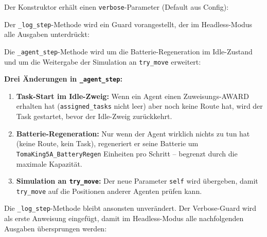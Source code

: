 Der Konstruktor erhält einen \texttt{verbose}-Parameter (Default aus Config):



Der \texttt{\_log\_step}-Methode wird ein Guard vorangestellt, der im Headless-Modus alle Ausgaben unterdrückt:



Die \texttt{\_agent\_step}-Methode wird um die Batterie-Regeneration im Idle-Zustand und um die Weitergabe der Simulation an \texttt{try\_move} erweitert:



\textbf{Drei Änderungen in \texttt{\_agent\_step}:}
\begin{enumerate}
    \item \textbf{Task-Start im Idle-Zweig:} Wenn ein Agent einen Zuweisungs-AWARD erhalten hat (\texttt{assigned\_tasks} nicht leer) aber noch keine Route hat, wird der Task gestartet, bevor der Idle-Zweig zurückkehrt.
    \item \textbf{Batterie-Regeneration:} Nur wenn der Agent wirklich nichts zu tun hat (keine Route, kein Task), regeneriert er seine Batterie um \texttt{TomaKing5A\_BatteryRegen} Einheiten pro Schritt -- begrenzt durch die maximale Kapazität.
    \item \textbf{Simulation an \texttt{try\_move}:} Der neue Parameter \texttt{self} wird übergeben, damit \texttt{try\_move} auf die Positionen anderer Agenten prüfen kann.
\end{enumerate}

Die \texttt{\_log\_step}-Methode bleibt ansonsten unverändert. Der Verbose-Guard wird als erste Anweisung eingefügt, damit im Headless-Modus alle nachfolgenden Ausgaben übersprungen werden:



